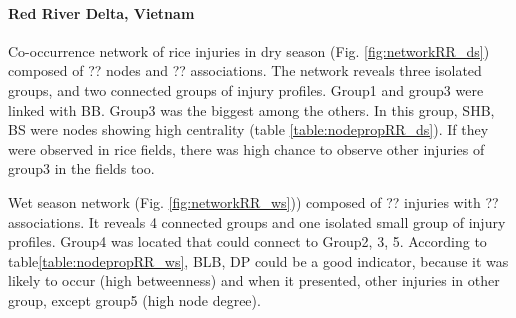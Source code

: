 \paragraph{Red River Delta, Vietnam}
 
Co-occurrence network of rice injuries in dry season (Fig. \ref{fig:networkRR_ds}) composed of ?? nodes and ?? associations. The network reveals three isolated groups, and two connected groups of injury profiles. Group1 and group3 were linked with BB. Group3 was the biggest among the others. In this group, SHB, BS were nodes showing high centrality (table \ref{table:nodepropRR_ds}). If they were observed in rice fields, there was high chance to observe other injuries of group3 in the fields too.

Wet season network (Fig. \ref{fig:networkRR_ws})) composed of ?? injuries with ?? associations. It reveals 4 connected groups and one isolated small group of injury profiles. Group4 was located that could connect to Group2, 3, 5. According to table\ref{table:nodepropRR_ws}, BLB, DP could be a good indicator, because it was likely to occur (high betweenness) and when it presented, other injuries in other group, except group5 (high node degree). 


